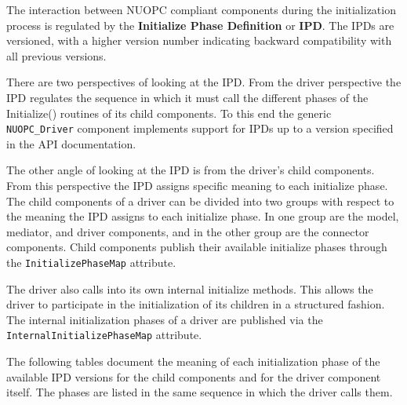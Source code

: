 %

\label{IPD}

The interaction between NUOPC compliant components during the initialization process is regulated by the {\bf Initialize Phase Definition} or {\bf IPD}. The IPDs are versioned, with a higher version number indicating backward compatibility with all previous versions.

There are two perspectives of looking at the IPD. From the driver perspective the IPD regulates the sequence in which it must call the different phases of the Initialize() routines of its child components. To this end the generic {\tt NUOPC\_Driver} component implements support for IPDs up to a version specified in the API documentation.

The other angle of looking at the IPD is from the driver's child components. From this perspective the IPD assigns specific meaning to each initialize phase. The child components of a driver can be divided into two groups with respect to the meaning the IPD assigns to each initialize phase. In one group are the model, mediator, and driver components, and in the other group are the connector components. Child components publish their available initialize phases through the {\tt InitializePhaseMap} attribute.

The driver also calls into its own internal initialize methods. This allows the driver to participate in the initialization of its children in a structured fashion. The internal initialization phases of a driver are published via the {\tt InternalInitializePhaseMap} attribute.

The following tables document the meaning of each initialization phase of the available IPD versions for the child components and for the driver component itself. The phases are listed in the same sequence in which the driver calls them.
\newline


